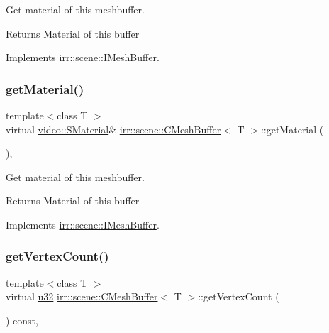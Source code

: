 Get material of this meshbuffer. 

\begin{DoxyReturn}{Returns}
Material of this buffer 
\end{DoxyReturn}


Implements \hyperlink{classirr_1_1scene_1_1IMeshBuffer_a341c1da2fd0cd556a15aab06d07dbbaa}{irr\+::scene\+::\+I\+Mesh\+Buffer}.

\mbox{\label{classirr_1_1scene_1_1CMeshBuffer_af69e8356b4525a3fee1ddbf188d81e8a}} 
\subsubsection{\texorpdfstring{get\+Material()}{getMaterial()}\hspace{0.1cm}{\footnotesize\ttfamily [2/2]}}
{\footnotesize\ttfamily template$<$class T $>$ \\
virtual \hyperlink{classirr_1_1video_1_1SMaterial}{video\+::\+S\+Material}\& \hyperlink{classirr_1_1scene_1_1CMeshBuffer}{irr\+::scene\+::\+C\+Mesh\+Buffer}$<$ T $>$\+::get\+Material (\begin{DoxyParamCaption}{ }\end{DoxyParamCaption})\hspace{0.3cm}{\ttfamily [inline]}, {\ttfamily [virtual]}}



Get material of this meshbuffer. 

\begin{DoxyReturn}{Returns}
Material of this buffer 
\end{DoxyReturn}


Implements \hyperlink{classirr_1_1scene_1_1IMeshBuffer_a26fd922f00fde56abbbbbe40b485238b}{irr\+::scene\+::\+I\+Mesh\+Buffer}.

\mbox{\label{classirr_1_1scene_1_1CMeshBuffer_a72ee778498eff327a20c6be179976994}} 
\subsubsection{\texorpdfstring{get\+Vertex\+Count()}{getVertexCount()}}
{\footnotesize\ttfamily template$<$class T $>$ \\
virtual \hyperlink{namespaceirr_a0416a53257075833e7002efd0a18e804}{u32} \hyperlink{classirr_1_1scene_1_1CMeshBuffer}{irr\+::scene\+::\+C\+Mesh\+Buffer}$<$ T $>$\+::get\+Vertex\+Count (\begin{DoxyParamCaption}{ }\end{DoxyParamCaption}) const\hspace{0.3cm}{\ttfamily [inline]}, {\ttfamily [virtual]}}



